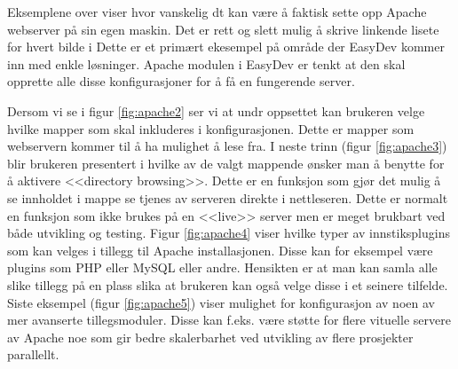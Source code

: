 Eksemplene over viser hvor vanskelig dt kan være å faktisk sette opp Apache webserver på sin egen maskin. Det er rett og slett mulig å skrive linkende lisete for hvert bilde i 
Dette er et primært ekesempel på område der EasyDev kommer inn med enkle løsninger. Apache modulen i EasyDev er tenkt at den skal opprette alle disse konfigurasjoner for å få en fungerende server.

Dersom vi se i figur \ref{fig:apache2} ser vi at undr oppsettet kan brukeren velge hvilke mapper som skal inkluderes i konfigurasjonen. Dette er mapper som webservern kommer til å ha mulighet å lese fra. 
I neste trinn (figur \ref{fig:apache3}) blir brukeren presentert i hvilke av de valgt mappende ønsker man å benytte for å aktivere <<directory browsing>>. Dette er en funksjon som gjør det mulig å se innholdet i mappe se tjenes av serveren direkte i nettleseren. Dette er normalt en funksjon som ikke brukes på en <<live>> server men er meget brukbart ved både utvikling og testing. 
Figur \ref{fig:apache4} viser hvilke typer av innstiksplugins som kan velges i tillegg til Apache installasjonen. Disse kan for eksempel være plugins som PHP eller MySQL eller andre. Hensikten er at man kan samla alle slike tillegg på en plass slika at brukeren kan også velge disse i et seinere tilfelde.
Siste eksempel (figur \ref{fig:apache5}) viser mulighet for konfigurasjon av noen av mer avanserte tillegsmoduler. Disse kan f.eks. være støtte for flere vituelle servere av Apache noe som gir bedre skalerbarhet ved utvikling av flere prosjekter parallellt. 
